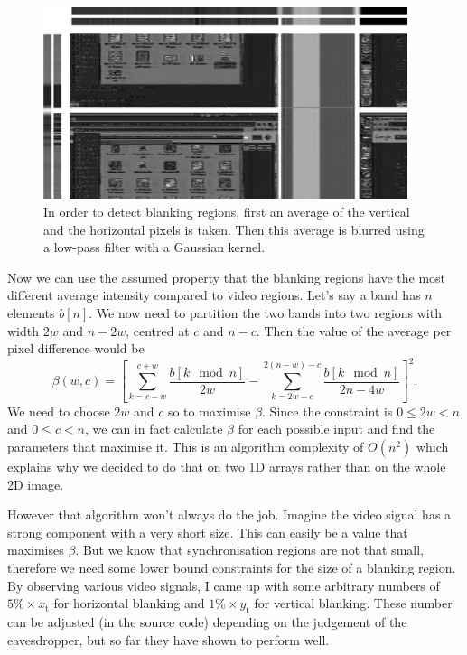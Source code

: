 \documentclass[a4paper,12pt,twoside,openright]{report}
\begin{document}
\begin{figure}[h]
\centering
\includegraphics[width=0.95\textwidth]{framedetection}
\caption{In order to detect blanking regions, first an average of the vertical and the horizontal pixels is taken. Then this average is blurred using a low-pass filter with a Gaussian kernel.}
\label{fig:syncingavg}
\end{figure}

Now we can use the assumed property that the blanking regions have the most different average intensity compared to video regions. Let's say a band has $n$ elements $b[n]$. We now need to partition the two bands into two regions with width $2w$ and $n-2w$, centred at $c$ and $n-c$. Then the value of the average per pixel difference would be
$$ \beta (w, c) =  \left[
\sum_{k=c-w}^{c+w} \frac{b[k \mod n]}{2w} -
\sum_{k=2w-c}^{2(n-w)-c} \frac{b[k \mod n]}{2n-4w}
\right] ^ 2 .$$
We need to choose $2w$ and $c$ so to maximise $\beta$. Since the constraint is $0 \leq 2w < n$ and $0 \leq c < n$, we can in fact calculate $\beta$ for each possible input and find the parameters that maximise it. This is an algorithm complexity of $O(n^2)$ which explains why we decided to do that on two 1D arrays rather than on the whole 2D image.

However that algorithm won't always do the job. Imagine the video signal has a strong component with a very short size. This can easily be a value that maximises $\beta$. But we know that synchronisation regions are not that small, therefore we need some lower bound constraints for the size of a blanking region. By observing various video signals, I came up with some arbitrary numbers of $5\% \times x_\text{t}$ for horizontal blanking and $1\% \times y_\text{t}$ for vertical blanking. These number can be adjusted (in the source code) depending on the judgement of the eavesdropper, but so far they have shown to perform well.
\end{document}
